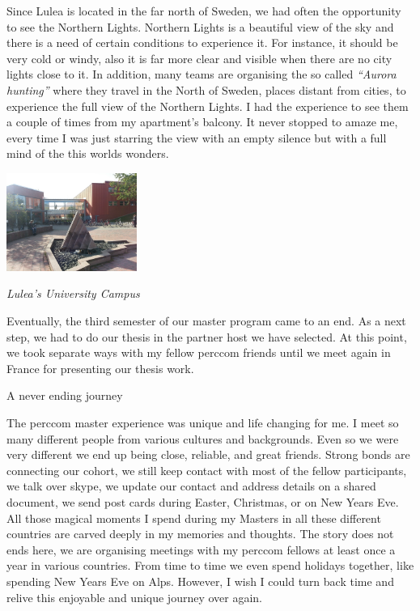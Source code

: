 \documentclass[10pt,a4paper]{article} %
\newcommand{\NewsItem}[1]{ %
\usefont{T1}{fvs}{n}{n} %
\vspace{24pt}\large #1\vspace{3pt} %
\par \normalsize \normalfont}
\begin{document}
\begin{multicols}{3}
Since Lulea is located in the far north of Sweden, we had often the opportunity to 
see the Northern Lights. 
Northern Lights is a beautiful view of the sky and there is a need of certain 
conditions to experience it. 
For instance, it should be very cold or windy, also it is far more clear and visible 
when there are no city lights close to it. 
In addition, many teams are organising the so called \textit{``Aurora hunting''} 
where they travel in the North of Sweden, places distant from cities, to experience 
the full view of the Northern Lights. 
I had the experience to see them a couple of times from my apartment's balcony. 
It never stopped to amaze me, every time I was just starring the view with an empty 
silence but with a full mind of the this worlds wonders.
 


\begin{center}
	\includegraphics[width=0.32\textwidth]{media/campus_lulea.jpg}
	\par\textit{Lulea's University Campus}
\end{center}


Eventually, the third semester of our master program came to an end. 
As a next step, we had to do our thesis in the partner host we have selected. 
At this point, we took separate ways with my fellow {\sc perccom} friends 
until we meet again in France for presenting our thesis work. 




\NewsItem{A never ending journey}

The {\sc perccom} master experience was unique and life changing for me. 
I meet so many different people from various cultures and backgrounds. 
Even so we were very different we end up being close, reliable, and great friends.
Strong bonds are connecting our cohort, we still keep contact with most of the 
fellow participants, we talk over skype, we update our contact and address details 
on a shared document, we send post cards during Easter, Christmas, 
or on New Years Eve.
All those magical moments I spend during my Masters in all these different countries 
are carved deeply in my memories and thoughts. 
The story does not ends here, we are organising meetings with my {\sc perccom} 
fellows at least once a year in various countries. 
From time to time we even spend holidays together, like spending New Years Eve on 
Alps. 
However, I wish I could turn back time and relive this enjoyable and 
unique journey over again. 



\end{multicols}
\end{document}
